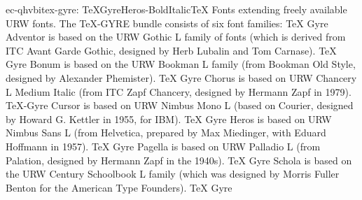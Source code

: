 \documentclass{ddltxtyp}
\begin{document}
\begin{package}{ec-qhvbi}{tex-gyre: TeXGyreHeros-BoldItalic}{{\TeX} Fonts extending freely available URW fonts.}
The {\TeX}-GYRE bundle consists of six font families: {\TeX} Gyre
Adventor is based on the URW Gothic L family of fonts (which is
derived from ITC Avant Garde Gothic, designed by Herb Lubalin
and Tom Carnase). {\TeX} Gyre Bonum is based on the URW Bookman L
family (from Bookman Old Style, designed by Alexander
Phemister). {\TeX} Gyre Chorus is based on URW Chancery L Medium
Italic (from ITC Zapf Chancery, designed by Hermann Zapf in
1979). {\TeX}-Gyre Cursor is based on URW Nimbus Mono L (based on
Courier, designed by Howard G. Kettler in 1955, for IBM). {\TeX}
Gyre Heros is based on URW Nimbus Sans L (from Helvetica,
prepared by Max Miedinger, with Eduard Hoffmann in 1957). {\TeX}
Gyre Pagella is based on URW Palladio L (from Palation,
designed by Hermann Zapf in the 1940s). {\TeX} Gyre Schola is
based on the URW Century Schoolbook L family (which was
designed by Morris Fuller Benton for the American Type
Founders). {\TeX} Gyre %
\end{package}
\end{document}
